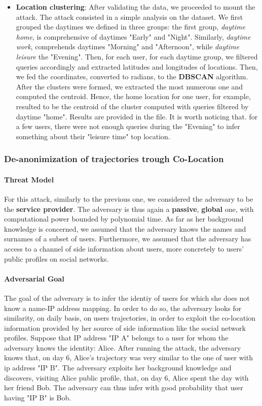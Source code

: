 \documentclass[10pt,conference,compsocconf]{IEEEtran}
\begin{document}
\begin{itemize}
    \item \textbf{Location clustering}: After validating the data, we proceeded to mount the attack. The attack consisted in a simple analysis on the dataset. We first grouped the daytimes we defined in three groups: the first group, \textit{daytime home}, is comprehensive of daytimes "Early" and "Night". Similarly, \textit{daytime work}, comprehends daytimes "Morning" and "Afternoon", while \textit{daytime leisure} the "Evening". Then, for each user, for each daytime group, we filtered queries accordingly and extracted latitudes and longitudes of locations. Then, we fed the coordinates, converted to radians, to the \textbf{DBSCAN} algorithm. After the clusters were formed, we extracted the most numerous one and computed the centroid. Hence, the home location for one user, for example, resulted to be the centroid of the cluster computed with queries filtered by daytime "home". Results are provided in the  file. It is worth noticing that. for a few users, there were not enough queries during the "Evening" to infer something about their "leisure time" top location.
\end{itemize}

\subsubsection{De-anonimization of trajectories trough Co-Location}


\paragraph{Threat Model}
For this attack, similarly to the previous one, we considered the adversary to be the \textbf{service provider}. The adversary is thus again a \textbf{passive}, \textbf{global} one, with computational power bounded by polynomial time.\newline
As far as her background knowledge is concerned, we assumed that the adversary knows the names and surnames of a subset of users. Furthermore, we assumed that the adversary has access to a channel of side information about users, more concretely to users' public profiles on social networks.


\paragraph{Adversarial Goal}
The goal of the adversary is to infer the identiy of users for which she does not know a name-IP address mapping. In order to do so, the adversary looks for similarity, on daily basis, on users trajectories, in order to exploit the co-location information provided by her source of side information like the social network profiles. Suppose that IP address "IP A" belongs to a user for whom the adversary knows the identity: Alice. After running the attack, the adversary knows
that, on day 6, Alice's trajectory was very similar to the one of user with ip address "IP B". The adversary exploits her background knowledge and discovers, visiting Alice public profile, that, on day 6, Alice spent the day with her friend Bob. The adversary can thus infer with good probability that user having "IP B" is Bob.
\end{document}
